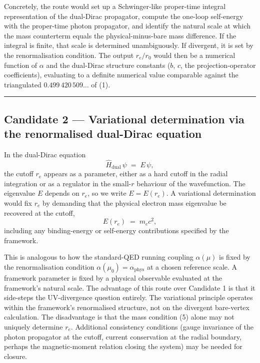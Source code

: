 \documentclass[
  11pt,
]{article}
\begin{document}
Concretely, the route would set up a Schwinger-like proper-time integral
representation of the dual-Dirac propagator, compute the one-loop
self-energy with the proper-time photon propagator, and identify the
natural scale at which the mass counterterm equals the
physical-minus-bare mass difference. If the integral is finite, that
scale is determined unambiguously. If divergent, it is set by the
renormalisation condition. The output \(r_e/r_0\) would then be a
numerical function of \(\alpha\) and the dual-Dirac structure constants
(\(b\), \(c\), the projection-operator coefficients), evaluating to a
definite numerical value comparable against the triangulated
\(0.499\,420\,509\ldots\) of (1).

\begin{center}\rule{0.5\linewidth}{0.5pt}\end{center}

\hypertarget{candidate-2-variational-determination-via-the-renormalised-dual-dirac-equation}{%
\subsection{Candidate 2 --- Variational determination via the
renormalised dual-Dirac
equation}\label{candidate-2-variational-determination-via-the-renormalised-dual-dirac-equation}}

In the dual-Dirac equation \[
\hat{H}_{\text{dual}} \,\psi \;=\; E\,\psi, \tag{4}
\] the cutoff \(r_e\) appears as a parameter, either as a hard cutoff in
the radial integration or as a regulator in the small-\(r\) behaviour of
the wavefunction. The eigenvalue \(E\) depends on \(r_e\), so we write
\(E = E(r_e)\). A variational determination would fix \(r_e\) by
demanding that the physical electron mass eigenvalue be recovered at the
cutoff, \[
E(r_e) \;=\; m_e c^2, \tag{5}
\] including any binding-energy or self-energy contributions specified
by the framework.

This is analogous to how the standard-QED running coupling
\(\alpha(\mu)\) is fixed by the renormalisation condition
\(\alpha(\mu_0) = \alpha_{\text{phys}}\) at a chosen reference scale. A
framework parameter is fixed by a physical observable evaluated at the
framework's natural scale. The advantage of this route over Candidate 1
is that it side-steps the UV-divergence question entirely. The
variational principle operates within the framework's renormalised
structure, not on the divergent bare-vertex calculation. The
disadvantage is that the mass condition (5) alone may not uniquely
determine \(r_e\). Additional consistency conditions (gauge invariance
of the photon propagator at the cutoff, current conservation at the
radial boundary, perhaps the magnetic-moment relation closing the
system) may be needed for closure.
\end{document}
